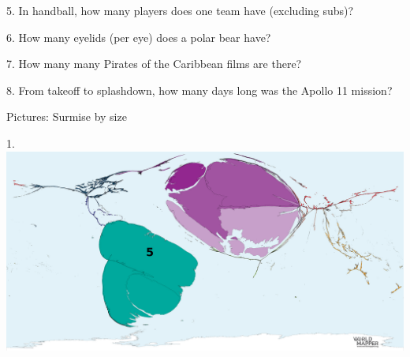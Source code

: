 \begin{frame}
\begin{center}
\Large
5. In handball, how many players does one team have (excluding subs)?
\\
\end{center}
\end{frame}
\begin{frame}
\begin{center}
\Large
6. How many eyelids (per eye) does a polar bear have?
\\
\end{center}
\end{frame}
\begin{frame}
\begin{center}
\Large
7. How many many Pirates of the Caribbean films are there?
\\
\end{center}
\end{frame}
\begin{frame}
\begin{center}
\Large
8. From takeoff to splashdown, how many days long was the Apollo 11 mission?
\\
\end{center}
\end{frame}
\begin{frame}
\begin{center}
\Huge
Pictures: Surmise by size
\end{center}
\end{frame}
\begin{frame}
\begin{center}
\Large
1. 
\\
\vspace{0.5em}\includegraphics[height=0.6\paperheight]{maps/picture_1.png}
\\
\end{center}
\end{frame}

